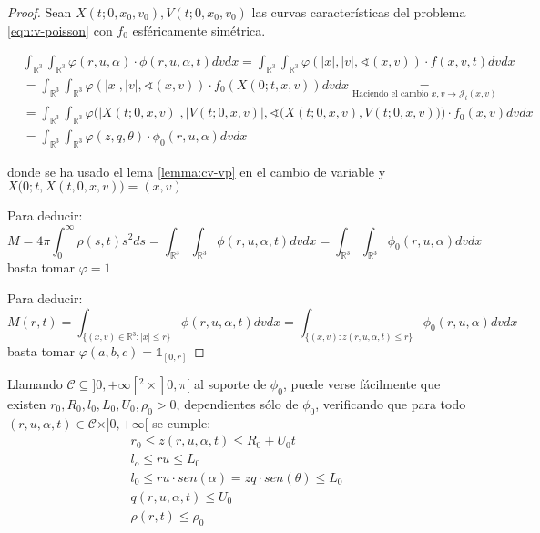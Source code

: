 \documentclass[a4paper,10pt]{scrartcl}
\theoremstyle{definition}
\numberwithin{equation}{section}
\begin{document}
\begin{proof}
Sean $X(t; 0, x_0, v_0), V(t; 0, x_0, v_0)$ las curvas características del problema \eqref{eqn:v-poisson} con $f_0$ esféricamente simétrica.

 \begin{align*}
 &\int_{\mathbb{R}^3}\int_{\mathbb{R}^3} \varphi(r,u,\alpha) \cdot \phi(r,u,\alpha,t) dv dx = \int_{\mathbb{R}^3}\int_{\mathbb{R}^3} \varphi(|x|,|v|,\sphericalangle(x,v)) \cdot f(x,v,t) dv dx \\
 &= \int_{\mathbb{R}^3}\int_{\mathbb{R}^3} \varphi(|x|,|v|,\sphericalangle(x,v)) \cdot f_0(X(0;t,x,v)) dv dx \underset{\textrm{Haciendo el cambio } x,v \rightarrow \mathcal{J}_t(x,v)}{=}\\
 &=\int_{\mathbb{R}^3}\int_{\mathbb{R}^3} \varphi\bigg(|X(t;0,x,v)|,|V(t;0,x,v)|,\sphericalangle\bigg(X(t;0,x,v), V(t;0,x,v)\bigg)\bigg) \cdot f_0(x,v) dv dx \\
 &= \int_{\mathbb{R}^3}\int_{\mathbb{R}^3} \varphi(z,q,\theta) \cdot \phi_0(r,u,\alpha) dv dx
 \end{align*}

 donde se ha usado el lema \ref{lemma:cv-vp} en el cambio de variable y $X\bigg(0;t,X(t,0,x,v)\bigg) = (x,v)$
 
 Para deducir:
 \[
  M = 4\pi \int_0^{\infty} \rho(s,t) s^2 ds = \int_{\mathbb{R}^3} \int_{\mathbb{R}^3} \phi(r,u,\alpha,t) dv dx = \int_{\mathbb{R}^3}\int_{\mathbb{R}^3} \phi_0(r,u,\alpha) dv dx  
 \]
 basta tomar $\varphi=1$
 
 Para deducir:
 \[
  M(r,t) = \int_{\{(x,v)\in \mathbb{R}^3:|x| \le r\}} \phi(r,u,\alpha,t) dv dx = \int_{\{(x,v): z(r,u,\alpha,t) \le r\}} \phi_0(r,u,\alpha) dv dx
 \]
 basta tomar $\varphi(a,b,c) = \mathds{1}_{[0,r]}$
\end{proof}


Llamando $\mathcal{C} \subseteq ]0, +\infty[^2 \times ]0, \pi[$ al soporte de $\phi_0$, puede verse fácilmente que existen $r_0, R_0, l_0, L_0, U_0, \rho_0 > 0$, dependientes sólo de $\phi_0$, verificando que para todo $(r,u,\alpha,t) \in \mathcal{C} \times ]0, +\infty[$ se cumple:
\begin{align}
 r_0 \le z(r,u,\alpha,t) \le R_0 + U_0 t \nonumber\\
 l_o \le ru \le L_0 \nonumber\\
 l_0 \le ru \cdot sen(\alpha) = zq \cdot sen(\theta) \le L_0 \nonumber\\
 q(r,u,\alpha, t) \le U_0 \nonumber \\
 \rho(r,t) \le \rho_0 \label{eqn:zbounds}
\end{align}
\end{document}
